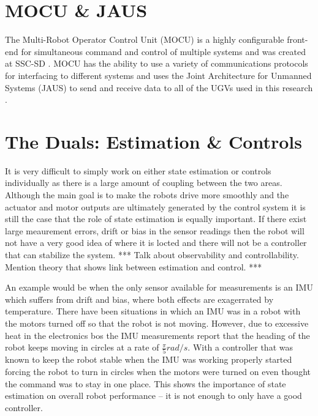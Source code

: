 \section{MOCU \& JAUS}
\label{sec:mocujaus}
The Multi-Robot Operator Control Unit (MOCU) is a highly configurable front-end for simultaneous command and control of multiple systems and was created at SSC-SD \cite{PowellMOCU08}. MOCU has the ability to use a variety of communications protocols for interfacing to different systems and uses the Joint Architecture for Unmanned Systems (JAUS) to send and receive data to all of the UGVs used in this research \cite{RoweJAUS08}.

\section{The Duals: Estimation \& Controls}
\label{sec:duals}
It is very difficult to simply work on either state estimation or controls individually as there is a large amount of coupling between the two areas. Although the main goal is to make the robots drive more smoothly and the actuator and motor outputs are ultimately generated by the control system it is still the case that the role of state estimation is equally important. If there exist large meaurement errors, drift or bias in the sensor readings then the robot will not have a very good idea of where it is locted and there will not be a controller that can stabilize the system. *** Talk about observability and controllability. Mention theory that shows link between estimation and control. ***

An example would be when the only sensor available for measurements is an IMU which suffers from drift and bias, where both effects are exagerrated by temperature. There have been situations in which an IMU was in a robot with the motors turned off so that the robot is not moving. However, due to excessive heat in the electronics bos the IMU measurements report that the heading of the robot keeps moving in circles at a rate of $\frac{\pi}{5} rad/s$. With a controller that was known to keep the robot stable when the IMU was working properly started forcing the robot to turn in circles when the motors were turned on even thought the command was to stay in one place. This shows the importance of state estimation on overall robot performance -- it is not enough to only have a good controller.